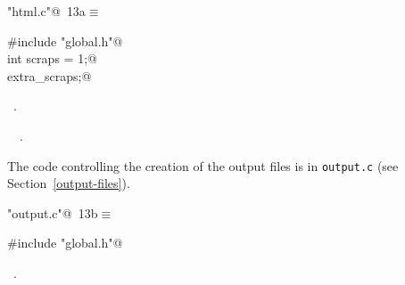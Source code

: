 \documentclass[a4paper]{report}
\begin{document}
\begin{flushleft} \small
\begin{minipage}{\linewidth}\label{scrap8}\raggedright\small
{} \verb@"html.c"@\nobreak\ {\footnotesize {13a}}$\equiv$
\vspace{-1ex}
\begin{list}{}{} \item
\mbox{}\verb@#include "global.h"@\\
\mbox{}\verb@static int scraps = 1;@\\
\mbox{}\verb@int extra_scraps;@\\
\mbox{}\verb@@{\NWsep}
\end{list}
\vspace{-1.5ex}
\footnotesize
\begin{list}{}{\setlength{\itemsep}{-\parsep}\setlength{\itemindent}{-\leftmargin}}
\item \NWtxtFileDefBy\ .
\item \NWtxtIdentsUsed\nobreak\  \verb@scraps@\nobreak\ .
\item{}
\end{list}
\end{minipage}\vspace{4ex}
\end{flushleft}
The code controlling the creation of the output files is in \verb|output.c|
(see Section~\ref{output-files}).
\begin{flushleft} \small
\begin{minipage}{\linewidth}\label{scrap9}\raggedright\small
{} \verb@"output.c"@\nobreak\ {\footnotesize {13b}}$\equiv$
\vspace{-1ex}
\begin{list}{}{} \item
\mbox{}\verb@#include "global.h"@\\
\mbox{}\verb@@{\NWsep}
\end{list}
\vspace{-1.5ex}
\footnotesize
\begin{list}{}{\setlength{\itemsep}{-\parsep}\setlength{\itemindent}{-\leftmargin}}
\item \NWtxtFileDefBy\ .

\item{}
\end{list}
\end{minipage}\vspace{4ex}
\end{flushleft}
\newpage
\end{document}
